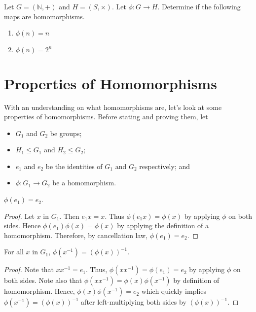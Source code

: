 \begin{exercise}
    Let $G = (\mathbb{N}, +)$ and $H = (S, \times)$. Let $\phi: G \to H$. Determine if the following maps are homomorphisms.
    \begin{enumerate}[label=(\alph*)]
        \item $\phi(n) = n$
        \item $\phi(n) = 2^n$
    \end{enumerate}
\end{exercise}

\newpage

\section{Properties of Homomorphisms}
With an understanding on what homomorphisms are, let's look at some properties of homomorphisms. Before stating and proving them, let
\begin{itemize}
    \item $G_1$ and $G_2$ be groups;
    \item $H_1 \leq G_1$ and $H_2 \leq G_2$;
    \item $e_1$ and $e_2$ be the identities of $G_1$ and $G_2$ respectively; and
    \item $\phi: G_1 \to G_2$ be a homomorphism.
\end{itemize}

\begin{proposition}
    $\phi(e_1) = e_2$.
\end{proposition}
\begin{proof}
    Let $x$ in $G_1$. Then $e_1x = x$. Thus $\phi(e_1x) = \phi(x)$ by applying $\phi$ on both sides. Hence $\phi(e_1)\phi(x) = \phi(x)$ by applying the definition of a homomorphism. Therefore, by cancellation law, $\phi(e_1) = e_2$.
\end{proof}

\begin{proposition}
    For all $x$ in $G_1$, $\phi(x^{-1}) = \left(\phi(x)\right)^{-1}$.
\end{proposition}
\begin{proof}
    Note that $xx^{-1} = e_1$. Thus, $\phi(xx^{-1}) = \phi(e_1) = e_2$ by applying $\phi$ on both sides. Note also that $\phi(xx^{-1}) = \phi(x)\phi(x^{-1})$ by definition of homomorphism. Hence, $\phi(x)\phi(x^{-1}) = e_2$ which quickly implies $\phi(x^{-1}) = \left(\phi(x)\right)^{-1}$ after left-multiplying both sides by $\left(\phi(x)\right)^{-1}$.
\end{proof}

